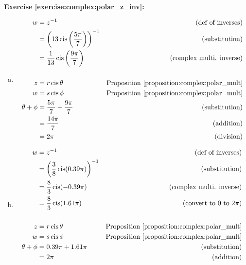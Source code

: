 \noindent\textbf{Exercise \ref{exercise:complex:polar_z_inv}:}
\begin{enumerate}[(a)]
\item
\begin{align*}
w &= z^{-1} &\text{(def of inverses)}\\
&= \left(13 \cis\left(\frac{5\pi}{7}\right)\right)^{-1} &\text{(substitution)}\\
&= \frac{1}{13}\cis\left(\frac{9\pi}{7}\right) &\text{(complex multi. inverse)}\\
\\
z &= r\cis\theta &\text{Proposition~\ref{proposition:complex:polar_mult}}\\
w &= s\cis\phi &\text{Proposition~\ref{proposition:complex:polar_mult}}\\
\theta + \phi &= \frac{5\pi}{7} + \frac{9\pi}{7} &\text{(substitution)}\\
&= \frac{14\pi}{7} &\text{(addition)}\\
&= 2\pi &\text{(division)}
\end{align*}

\item
\begin{align*}
w &= z^{-1} &\text{(def of inverses)}\\
&= \left(\frac{3}{8} \cis(0.39\pi)\right)^{-1} &\text{(substitution)}\\
&= \frac{8}{3} \cis(-0.39\pi) &\text{(complex multi. inverse)}\\
&= \frac{8}{3} \cis(1.61\pi) &\text{(convert to 0 to 2$\pi$)}\\
\\
z &= r\cis\theta &\text{Proposition~\ref{proposition:complex:polar_mult}}\\
w &= s\cis\phi &\text{Proposition~\ref{proposition:complex:polar_mult}}\\
\theta + \phi &= 0.39\pi + 1.61\pi &\text{(substitution)}\\
&= 2\pi &\text{(addition)}
\end{align*}


\end{enumerate}

